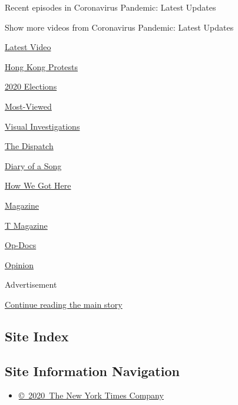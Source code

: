 Recent episodes in Coronavirus Pandemic: Latest Updates

Show more videos from Coronavirus Pandemic: Latest Updates

\href{/video}{}

\href{/video/latest-video}{Latest Video}

\href{/video/hk-protest}{Hong Kong Protests}

\href{/video/2020-Elections}{2020 Elections}

\href{/video/Most-Viewed}{Most-Viewed}

\href{/video/investigations}{Visual Investigations}

\href{/video/on-the-ground}{The Dispatch}

\href{/video/diaryofasong}{Diary of a Song}

\href{/video/how-we-got-here}{How We Got Here}

\href{/video/magazine}{Magazine}

\href{/video/t-magazine}{T Magazine}

\href{/video/op-docs}{Op-Docs}

\href{/video/opinion}{Opinion}

Advertisement

\protect\hyperlink{after-bottom}{Continue reading the main story}

\hypertarget{site-index}{%
\subsection{Site Index}\label{site-index}}

\hypertarget{site-information-navigation}{%
\subsection{Site Information
Navigation}\label{site-information-navigation}}

\begin{itemize}
\tightlist
\item
  \href{https://help.nytimes3xbfgragh.onion/hc/en-us/articles/115014792127-Copyright-notice}{©~2020~The
  New York Times Company}
\end{itemize}

